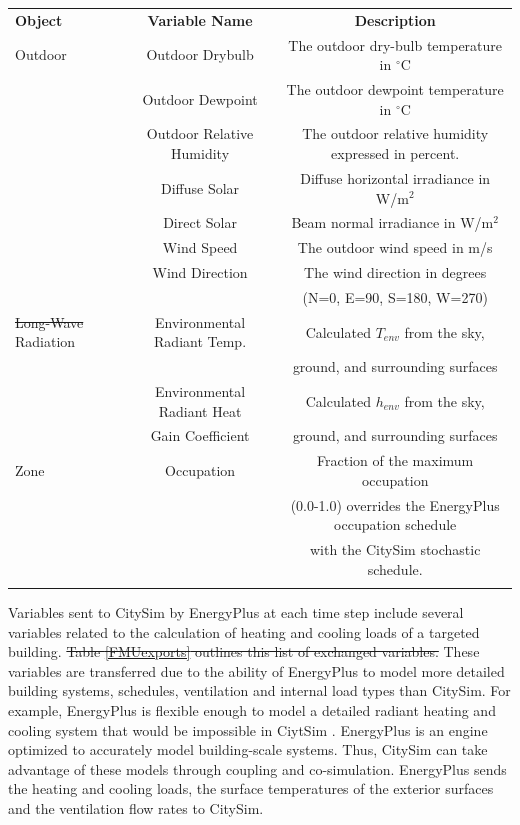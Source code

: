 \documentclass{tBPS2e}
\theoremstyle{plain}
\theoremstyle{definition}
\theoremstyle{remark}
\newcommand{\noteDT}[1]{\footnote{\textcolor{green}{#1}}}
\providecommand{\DIFadd}[1]{{\protect\color{blue}\uwave{#1}}} %
\providecommand{\DIFdel}[1]{{\protect\color{red}\sout{#1}}}                      %
\providecommand{\DIFaddbegin}{} %
\providecommand{\DIFaddend}{} %
\providecommand{\DIFdelbegin}{} %
\providecommand{\DIFdelend}{} %
\providecommand{\DIFaddFL}[1]{\DIFadd{#1}} %
\providecommand{\DIFdelFL}[1]{\DIFdel{#1}} %
\providecommand{\DIFaddbeginFL}{} %
\providecommand{\DIFaddendFL}{} %
\providecommand{\DIFdelbeginFL}{} %
\providecommand{\DIFdelendFL}{} %
\begin{document}

\DIFaddbegin 

\DIFaddend \begin{table}[H]
{\begin{tabular}[l]{@{}lcc}\toprule
  \bf{Object} &  \bf{Variable Name} & \bf{Description} \\
\colrule
  Outdoor & Outdoor Drybulb & The outdoor dry-bulb temperature in $^{\circ}\mathrm{C}$ \\
 & Outdoor Dewpoint & The outdoor dewpoint temperature in $^{\circ}\mathrm{C}$ \\
 & Outdoor Relative Humidity & The outdoor relative humidity expressed in percent. \\
 & Diffuse Solar & Diffuse horizontal irradiance in W/m$^2$ \\
 & Direct Solar & Beam normal irradiance in W/m$^2$ \\
 & Wind Speed & The outdoor wind speed in m/s \\
 & Wind Direction & The wind direction in degrees\\&&  (N=0, E=90, S=180, W=270) \\
 \hline
 \DIFdelbeginFL \DIFdelFL{Long-Wave }\DIFdelendFL \DIFaddbeginFL \DIFaddFL{Long Wave }\DIFaddendFL Radiation & Environmental Radiant Temp. & Calculated $T_{env}$ from the sky,\\&& ground, and surrounding surfaces \\
 & Environmental Radiant Heat  & Calculated $h_{env}$ from the sky,\\
 & Gain Coefficient & ground, and surrounding surfaces \\

 \hline
Zone & Occupation & Fraction of the maximum occupation\\&& (0.0-1.0) overrides the EnergyPlus occupation schedule\\&&  with the CitySim stochastic schedule. \\
\botrule
\end{tabular}}
\label{FMUimports}
\end{table}

Variables sent to CitySim by EnergyPlus at each time step include several
variables related to the calculation of heating and cooling loads of a
targeted building. \DIFdelbegin \DIFdel{Table \ref{FMUexports} outlines this list of exchanged variables.
}\DIFdelend These variables are transferred due to the ability of
EnergyPlus to model more detailed building systems, schedules, ventilation and
internal load types than CitySim. For example, EnergyPlus is flexible enough
to model a detailed radiant heating and cooling system that would be
impossible in CiytSim \DIFaddbegin \DIFadd{\mbox{%
\citep{barbara:2015tz}}%
}\DIFaddend . EnergyPlus is an engine
optimized to accurately model building-scale systems. Thus, CitySim can take 
advantage of these models through coupling and co-simulation. EnergyPlus sends
the heating and cooling loads, the surface temperatures of the exterior
surfaces and the ventilation flow rates to CitySim.
\end{document}

